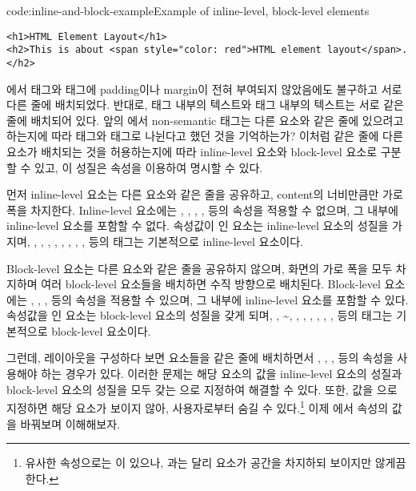 \begin{code}{code:inline-and-block-example}{Example of inline-level, block-level elements}
\begin{verbatim}
<h1>HTML Element Layout</h1>
<h2>This is about <span style="color: red">HTML element layout</span>.</h2>
\end{verbatim}
\end{code}

에서  태그와  태그에 padding이나 margin이 전혀 부여되지 않았음에도 불구하고 서로 다른 줄에 배치되었다. 반대로,  태그 내부의 텍스트와  태그 내부의 텍스트는 서로 같은 줄에 배치되어 있다. 앞의 에서 non-semantic 태그는 다른 요소와 같은 줄에 있으려고 하는지에 따라  태그와  태그로 나뉜다고 했던 것을 기억하는가? 이처럼 같은 줄에 다른 요소가 배치되는 것을 허용하는지에 따라 inline-level 요소와 block-level 요소로 구분할 수 있고, 이 성질은  속성을 이용하여 명시할 수 있다.

먼저 inline-level 요소는 다른 요소와 같은 줄을 공유하고, content의 너비만큼만 가로 폭을 차지한다. Inline-level 요소에는 , , , ,  등의 속성을 적용할 수 없으며, 그 내부에 inline-level 요소를 포함할 수 없다.  속성값이 인 요소는 inline-level 요소의 성질을 가지며, , , , , , , , ,  등의 태그는 기본적으로 inline-level 요소이다.

Block-level 요소는 다른 요소와 같은 줄을 공유하지 않으며, 화면의 가로 폭을 모두 차지하며 여러 block-level 요소들을 배치하면 수직 방향으로 배치된다. Block-level 요소에는 , , ,  등의 속성을 적용할 수 있으며, 그 내부에 inline-level 요소를 포함할 수 있다.  속성값을 인 요소는 block-level 요소의 성질을 갖게 되며, , \textasciitilde{}, , , , , , ,  등의 태그는 기본적으로 block-level 요소이다.

그런데, 레이아웃을 구성하다 보면 요소들을 같은 줄에 배치하면서 , , ,  등의 속성을 사용해야 하는 경우가 있다. 이러한 문제는 해당 요소의  값을 inline-level 요소의 성질과 block-level 요소의 성질을 모두 갖는 으로 지정하여 해결할 수 있다. 또한,  값을 으로 지정하면 해당 요소가 보이지 않아, 사용자로부터 숨길 수 있다.\footnote{유사한 속성으로는 이 있으나, 과는 달리 요소가 공간을 차지하되 보이지만 않게끔 한다.} 이제 에서  속성의 값을 바꿔보며 이해해보자.

